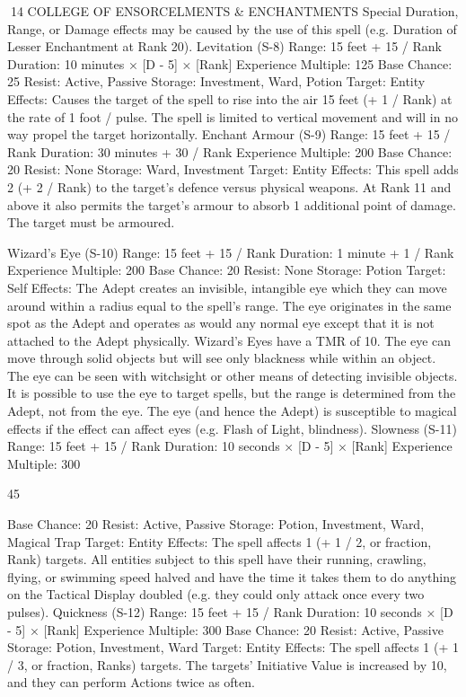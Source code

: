 \documentclass[a4paper]{article}
\begin{document}
\begin{multicols}{3}
14 COLLEGE OF ENSORCELMENTS & ENCHANTMENTS
Special Duration, Range, or Damage effects may
be caused by the use of this spell (e.g. Duration of
Lesser Enchantment at Rank 20).
Levitation (S-8)
Range: 15 feet + 15 / Rank
Duration: 10 minutes × [D - 5] × [Rank]
Experience Multiple: 125
Base Chance: 25%
Resist: Active, Passive
Storage: Investment, Ward, Potion
Target: Entity
Effects: Causes the target of the spell to rise into
the air 15 feet (+ 1 / Rank) at the rate of 1 foot /
pulse. The spell is limited to vertical movement
and will in no way propel the target horizontally.
Enchant Armour (S-9)
Range: 15 feet + 15 / Rank
Duration: 30 minutes + 30 / Rank
Experience Multiple: 200
Base Chance: 20%
Resist: None
Storage: Ward, Investment
Target: Entity
Effects: This spell adds 2 (+ 2 / Rank) to the target’s defence versus physical weapons. At Rank 11
and above it also permits the target’s armour to
absorb 1 additional point of damage. The target
must be armoured.

Wizard’s Eye (S-10)
Range: 15 feet + 15 / Rank
Duration: 1 minute + 1 / Rank
Experience Multiple: 200
Base Chance: 20%
Resist: None
Storage: Potion
Target: Self
Effects: The Adept creates an invisible, intangible
eye which they can move around within a radius
equal to the spell’s range. The eye originates in the
same spot as the Adept and operates as would any
normal eye except that it is not attached to the
Adept physically. Wizard’s Eyes have a TMR of
10.
The eye can move through solid objects but will
see only blackness while within an object. The eye
can be seen with witchsight or other means of
detecting invisible objects. It is possible to use the
eye to target spells, but the range is determined
from the Adept, not from the eye. The eye (and
hence the Adept) is susceptible to magical effects if
the effect can affect eyes (e.g. Flash of Light,
blindness).
Slowness (S-11)
Range: 15 feet + 15 / Rank
Duration: 10 seconds × [D - 5] × [Rank]
Experience Multiple: 300

45

Base Chance: 20%
Resist: Active, Passive
Storage: Potion, Investment, Ward, Magical Trap
Target: Entity
Effects: The spell affects 1 (+ 1 / 2, or fraction,
Rank) targets. All entities subject to this spell have
their running, crawling, flying, or swimming speed
halved and have the time it takes them to do anything on the Tactical Display doubled (e.g. they
could only attack once every two pulses).
Quickness (S-12)
Range: 15 feet + 15 / Rank
Duration: 10 seconds × [D - 5] × [Rank]
Experience Multiple: 300
Base Chance: 20%
Resist: Active, Passive
Storage: Potion, Investment, Ward
Target: Entity
Effects: The spell affects 1 (+ 1 / 3, or fraction,
Ranks) targets. The targets’ Initiative Value is
increased by 10, and they can perform Actions
twice as often.


\end{multicols}
\end{document}
